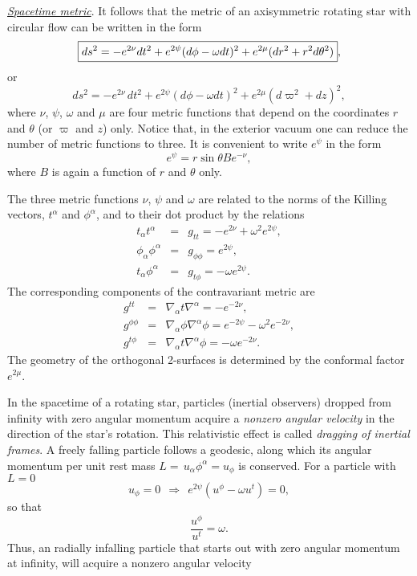 \documentclass[12pt]{article}
\def\be{\begin{equation}}
\def\ee{\end{equation}}
\def\ba{\begin{eqnarray}}
\def\ea{\end{eqnarray}}
\newcommand{\bsube}{\begin{subequations}}
\newcommand{\esube}{\end{subequations}}
\begin{document}
\vskip0.8cm

\noindent\textit{\uline{Spacetime metric}}. It follows that the metric of an axisymmetric rotating star with circular flow can be written in the form
\begin{equation}
  \boxed{ds^2 = -e^{2 \nu} dt^2 + e^{2 \psi} (d \phi - \omega dt)^2 + e^{2
\mu} (dr^2+r^2 d \theta^2)},
\label{eq:metric}
\index{metric!rotating star}\index{rotating stars!metric}\end{equation}
or 
\be
\boxed{ ds^2 = -e^{2\nu}\, dt^2 + e^{2\psi}(d\phi - \omega dt)^2
+ e^{2\mu} (d\varpi^2 + dz)^2}, 
\label{dsq}
\ee
where $\nu$, $\psi$, $\omega$ and $\mu $ are four metric functions
that depend on the coordinates $r$ and $\theta$ (or $\varpi$ and $z$) only. Notice that, in
the exterior vacuum one can reduce the number
of metric functions to three. 
It is convenient to write  $e^\psi$ in the form \cite{Bardeen73}
\begin{equation}
e^\psi=r \sin \theta B e^{-\nu},
\end{equation}
where $B$ is again a function of $r$ and $\theta$ only.
  



The three metric functions $\nu$, $\psi$ and
$\omega$ are related to the norms of the Killing vectors,  
$t^\alpha$ and $\phi^\alpha$, and to their dot product by the 
relations 
\bsube
\begin{eqnarray}
t_\alpha t^\alpha &=& g_{tt}= -e^{2\nu} + \omega^2 e^{2\psi}, \\
\phi_\alpha\phi^\alpha &=& g_{\phi \phi}= e^{2\psi}, \\
t_\alpha\phi^\alpha &=& g_{t\phi}= -\omega e^{2\psi}.
\end{eqnarray}\label{eq:killnorms}
\esube
The corresponding components of the contravariant metric are 
\bsube 
\ba
g^{tt} &=& \nabla_\alpha t \nabla^\alpha = -e^{-2\nu},\\
g^{\phi\phi}&=& \nabla_\alpha \phi \nabla^\alpha\phi 
        =  e^{-2\psi}-\omega^2 e^{-2\nu},\\
g^{t\phi}&=& \nabla_\alpha t \nabla^\alpha\phi = -\omega e^{-2\nu}.
\ea\esube
The geometry of the orthogonal 2-surfaces is determined by the
conformal factor $e^{2\mu}$.

\vskip0.8cm

In
the spacetime of a rotating star,  particles (inertial observers) dropped from infinity with zero angular momentum
acquire a \textit{nonzero
angular velocity} in the direction of the star's rotation. This relativistic effect is called  \textit{dragging of inertial frames}. A freely falling particle follows a geodesic, along which its angular momentum per unit rest mass  $L =\,u_\alpha \phi^\alpha =u_\phi$ is conserved. For a particle with $L=0$ 
\[
       u_\phi=0 \ \ \Rightarrow \ \ e^{2\psi}(u^\phi -\omega u^t)=0,
\] 
so that  
\be 
\boxed{\frac{u^\phi}{u^t} =\omega}.    
\ee
Thus, an radially infalling particle
that starts out with zero angular momentum at infinity, will acquire a nonzero angular velocity
\end{document}
